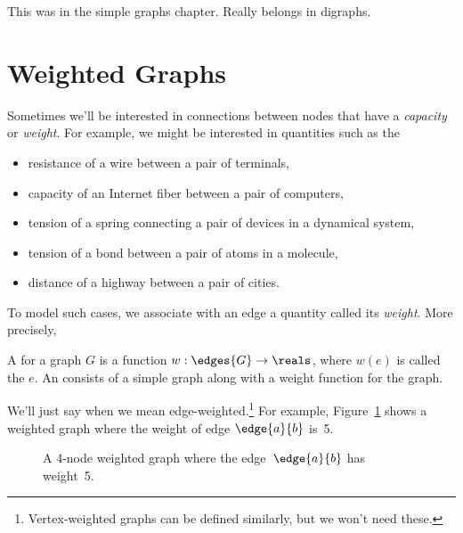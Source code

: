 \begin{editingnotes}
This was in the simple graphs chapter.  Really belongs in digraphs.
\end{editingnotes}

\section{Weighted Graphs}

Sometimes we'll be interested in connections between nodes that have a
\emph{capacity} or \emph{weight}.  For example, we might be interested in
quantities such as the
\begin{itemize}

\item resistance of a wire between a pair of terminals, 

\item capacity of an Internet fiber between a pair of computers,

\item tension of a spring connecting a pair of devices in a dynamical system,

\item tension of a bond between a pair of atoms in a molecule,

\item distance of a highway between a pair of cities.

\end{itemize}
To model such cases, we associate with an edge a quantity called its
\emph{weight}.  More precisely,
\begin{definition}
  A  for a graph $G$ is a function $w: \edges{G} \to
  \reals$, where $w(e)$ is called the  $e$.
An  consists of a simple graph along with
a weight function for the graph.
\end{definition}
We'll just say  when we mean
edge-weighted.\footnote{Vertex-weighted graphs can be defined similarly,
  but we won't need these.}
For example, Figure~\ref{fig:weighted_graph} shows a weighted graph
where the weight of edge $\edge{a}{b}$ is~5.

\begin{figure}


\caption{A 4-node weighted graph where the edge~$\edge{a}{b}$ has
  weight~5.}
\label{fig:weighted_graph}
\end{figure}

